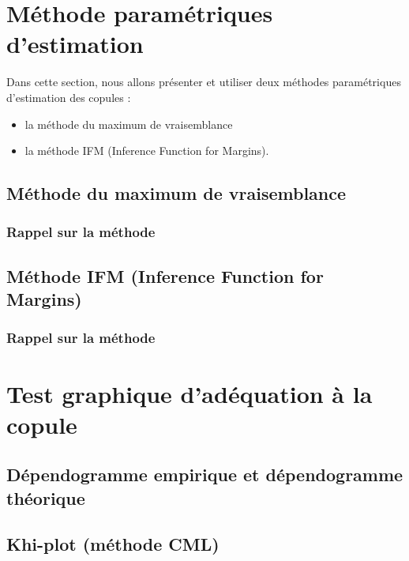 \section{Méthode paramétriques d'estimation}

Dans cette section, nous allons présenter et utiliser deux méthodes paramétriques d'estimation
des copules :

\begin{itemize}
\item la méthode du maximum de vraisemblance
\item la méthode IFM (Inference Function for Margins).
\end{itemize}

\subsection{Méthode du maximum de vraisemblance}

\subsubsection{Rappel sur la méthode}


\subsection{Méthode IFM (Inference Function for Margins)}

\subsubsection{Rappel sur la méthode}

\section{Test graphique d'adéquation à la copule}

\subsection{Dépendogramme empirique et dépendogramme théorique}

\subsection{Khi-plot (méthode CML)}

